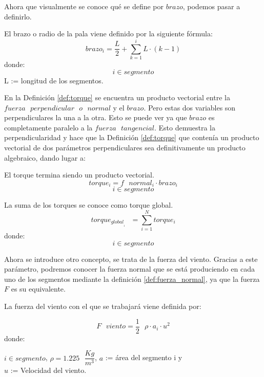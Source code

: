 Ahora que visualmente se conoce qué se define por $brazo$, podemos pasar a definirlo.

\begin{definicion}
El  brazo o radio de la pala viene definido por la siguiente fórmula:
$$ brazo_i = \dfrac{L}{2} + \sum_{k=1}^{i} L \cdot (k-1)$$
    donde:
 $$ i \in segmento$$
 \centering
 L := longitud de los segmentos. 

\end{definicion}

 
 En la Definición \ref{def:torque} se encuentra un producto vectorial entre la $fuerza  \text{ }perpendicular \text{ } o \text{ } normal$ y el $brazo$. Pero estas dos variables son perpendiculares la una a la otra. Esto se puede ver ya que $brazo$ es completamente paralelo a la $fuerza \text{ } tangencial$. Esto demuestra la perpendicularidad y hace que la Definición \ref{def:torque} que contenía un producto vectorial de dos parámetros perpendiculares sea definitivamente un producto algebraico, dando lugar a:
 
  \begin{definicion}
  El torque termina siendo un producto vectorial.
 $$ torque_i = f \text{ } normal_i \cdot brazo_i$$
 $$ i \in segmento$$
 \label{def:torque_vectorial}
 \end{definicion}
 
\begin{definicion}
 La suma de los torques se conoce como torque global.
 $$ torque_{global}__1 \text{ } = \sum_{i=1}^{N} torque_i $$
 donde:
 $$ i \in segmento$$
 \label{def:torque_global}
\end{definicion}

 Ahora se introduce otro concepto, se trata de la fuerza del viento. Gracias a este parámetro, podremos conocer la fuerza normal que se está produciendo en cada uno de los segmentos mediante la definición \ref{def:fuerza_normal}, ya que la fuerza $F$ es su equivalente.
 
 \begin{definicion}
 La fuerza del viento con el que se trabajará viene definida por:
 
 $$ F \text{ } viento = \dfrac{1}{2} \text{ } \rho \cdot a_i \cdot u^2$$
 donde:
 
  \centering $i \in segmento$,  $\rho = 1.225 \text{ } \dfrac{Kg}{m^3}$, $a$ := área del segmento i y \\ $u$ := Velocidad del viento.
 \label{def:fuerza_viento}
 \end{definicion}
 

